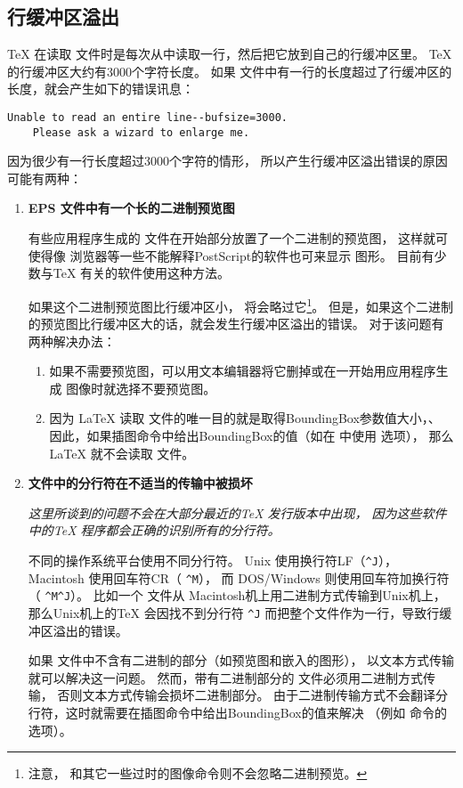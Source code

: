 \subsection{行缓冲区溢出}\label{ssec:linebuffer}

\TeX{} 在读取 \ascii 文件时是每次从中读取一行，然后把它放到自己的行缓冲区里。
\TeX{} 的行缓冲区大约有3000个字符长度。
如果  文件中有一行的长度超过了行缓冲区的长度，就会产生如下的错误讯息：

\begin{Verbatim}[xleftmargin=22pt]
	Unable to read an entire line--bufsize=3000.
	Please ask a wizard to enlarge me.
\end{Verbatim}

因为很少有一行长度超过3000个字符的情形，
所以产生行缓冲区溢出错误的原因可能有两种：

\begin{enumerate}
	\item \textbf{ EPS 文件中有一个长的二进制预览图}

	有些应用程序生成的 文件在开始部分放置了一个二进制的预览图，
	这样就可使得像 浏览器等一些不能解释PostScript的软件也可来显示  图形。
	目前有少数与\TeX{} 有关的软件使用这种方法。
	
	如果这个二进制预览图比行缓冲区小， 将会略过它\footnote{
        注意， 和其它一些过时的图像命令则不会忽略二进制预览。}。
	但是，如果这个二进制的预览图比行缓冲区大的话，就会发生行缓冲区溢出的错误。
	对于该问题有两种解决办法：
	
	\begin{enumerate}
		\item 如果不需要预览图，可以用文本编辑器将它删掉或在一开始用应用程序生成 图像时就选择不要预览图。
		\item 因为 \LaTeX{} 读取  文件的唯一目的就是取得BoundingBox参数值大小，、
		因此，如果插图命令中给出BoundingBox的值（如在  中使用  选项），
		那么\LaTeX{} 就不会读取  文件。
	\end{enumerate}
	
	\item \textbf{ 文件中的分行符在不适当的传输中被损坏}
	
	\emph{这里所谈到的问题不会在大部分最近的\TeX{} 发行版本中出现，
		因为这些软件中的\TeX{} 程序都会正确的识别所有的分行符。}
	
	不同的操作系统平台使用不同分行符。
	Unix 使用换行符LF（\verb+^J+），
	Macintosh 使用回车符CR（ \verb+^M+），
	而 DOS/Windows 则使用回车符加换行符（ \verb+^M^J+）。
	比如一个 文件从 Macintosh机上用二进制方式传输到Unix机上，
	那么Unix机上的\TeX{} 会因找不到分行符 \verb+^J+ 而把整个文件作为一行，导致行缓冲区溢出的错误。
	
	如果 文件中不含有二进制的部分（如预览图和嵌入的图形），
	以文本方式传输就可以解决这一问题。
	然而，带有二进制部分的  文件必须用二进制方式传输，
	否则文本方式传输会损坏二进制部分。
	由于二进制传输方式不会翻译分行符，这时就需要在插图命令中给出BoundingBox的值来解决
	（例如  命令的  选项）。
\end{enumerate}

